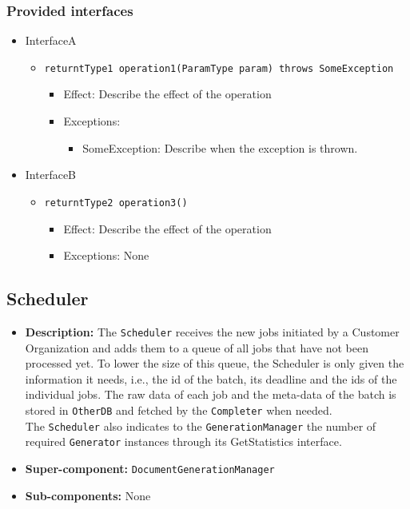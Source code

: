 \documentclass[a4paper,10pt]{article}
\begin{document}
\subsubsection*{Provided interfaces}
\begin{itemize}
    \item InterfaceA
    \begin{itemize}
        \item \texttt{returntType1 operation1(ParamType param) throws SomeException}
        \begin{itemize}
            \item Effect: Describe the effect of the operation
            \item Exceptions:
            \begin{itemize}
                \item SomeException: Describe when the exception is thrown.
            \end{itemize}
        \end{itemize}
    \end{itemize}

    \item InterfaceB
    \begin{itemize}
        \item \texttt{returntType2 operation3()}
        \begin{itemize}
            \item Effect: Describe the effect of the operation
            \item Exceptions: None
        \end{itemize}
    \end{itemize}
\end{itemize}

\subsection{Scheduler}
\begin{itemize}
    \item \textbf{Description:} The \texttt{Scheduler} receives the new jobs initiated by a Customer Organization and adds them to a queue of all jobs that have not been processed yet. To lower the size of this queue, the Scheduler is only given the information it needs, i.e., the id of the batch, its deadline and the ids of the individual jobs. The raw data of each job and the meta-data of the batch is stored in \texttt{OtherDB} and fetched by the \texttt{Completer} when needed.\\
    The \texttt{Scheduler} also indicates to the \texttt{GenerationManager} the number of required \texttt{Generator} instances through its GetStatistics interface.
    \item \textbf{Super-component:} \texttt{DocumentGenerationManager}
    \item \textbf{Sub-components:} None
\end{itemize}
\end{document}
